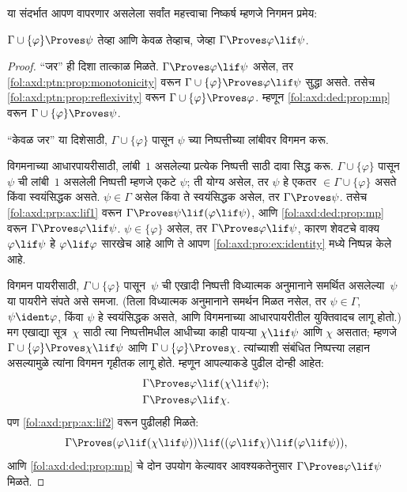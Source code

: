 या संदर्भात आपण वापरणार असलेला सर्वांत महत्त्वाचा निष्कर्ष म्हणजे निगमन
प्रमेय:

\begin{thm}[निगमन प्रमेय]
\label{fol:axd:ded:thm:deduction-thm} $\Gamma \cup \{\varphi\} \Proves \psi$ तेव्हा आणि
केवळ तेव्हाच, जेव्हा $\Gamma \Proves \varphi \lif \psi$.
\end{thm}

\begin{proof}
``जर'' ही दिशा तात्काळ मिळते. $\Gamma \Proves \varphi \lif \psi$ असेल, तर
\ref{fol:axd:ptn:prop:monotonicity} वरून $\Gamma \cup \{\varphi\} \Proves \varphi \lif \psi$
सुद्धा असते. तसेच \ref{fol:axd:ptn:prop:reflexivity} वरून
$\Gamma \cup \{\varphi\} \Proves \varphi$. म्हणून \ref{fol:axd:ded:prop:mp} वरून
$\Gamma \cup \{\varphi\} \Proves \psi$.

``केवळ जर'' या दिशेसाठी, $\Gamma \cup \{\varphi\}$ पासून $\psi$ च्या
निष्पत्तीच्या लांबीवर विगमन करू.

विगमनाच्या आधारपायरीसाठी, लांबी~$1$ असलेल्या प्रत्येक निष्पत्ती साठी
दावा सिद्ध करू. $\Gamma \cup \{\varphi\}$ पासून~$\psi$ ची लांबी~$1$ असलेली
निष्पत्ती म्हणजे एकटे $\psi$; ती योग्य असेल, तर $\psi$ हे एकतर
$\in \Gamma \cup \{\varphi\}$ असते किंवा स्वयंसिद्धक असते. $\psi \in \Gamma$
असेल किंवा ते स्वयंसिद्धक असेल, तर $\Gamma \Proves \psi$. तसेच
\ref{fol:axd:prp:ax:lif1} वरून $\Gamma \Proves \psi \lif (\varphi \lif \psi)$, आणि
\ref{fol:axd:ded:prop:mp} वरून $\Gamma \Proves \varphi \lif \psi$. $\psi \in \{ \varphi\}$
असेल, तर $\Gamma \Proves \varphi \lif \psi$, कारण शेवटचे वाक्य~$\varphi
\lif \psi$ हे $\varphi \lif \varphi$ सारखेच आहे आणि ते आपण
\ref{fol:axd:pro:ex:identity} मध्ये निष्पन्न केले आहे.

विगमन पायरीसाठी, $\Gamma \cup \{\varphi\}$ पासून~$\psi$ ची एखादी
निष्पत्ती विध्यात्मक अनुमानाने समर्थित असलेल्या~$\psi$ या पायरीने
संपते असे समजा. (तिला विध्यात्मक अनुमानाने समर्थन मिळत नसेल, तर
$\psi \in \Gamma$, $\psi \ident \varphi$, किंवा $\psi$ हे स्वयंसिद्धक असते, आणि
विगमनाच्या आधारपायरीतील युक्तिवादच लागू होतो.) मग एखाद्या
सूत्र~$\chi$ साठी त्या निष्पत्तीमधील आधीच्या काही पायऱ्या
$\chi \lif \psi$ आणि $\chi$ असतात; म्हणजे $\Gamma \cup \{\varphi\} \Proves \chi \lif \psi$
आणि $\Gamma \cup \{\varphi\} \Proves \chi$. त्यांच्याशी संबंधित
निष्पत्त्या लहान असल्यामुळे त्यांना विगमन गृहीतक लागू होते. म्हणून
आपल्याकडे पुढील दोन्ही आहेत:
\begin{align*}
  & \Gamma \Proves \varphi \lif (\chi \lif \psi); \\
  & \Gamma \Proves \varphi \lif \chi.
\end{align*}
पण \ref{fol:axd:prp:ax:lif2} वरून पुढीलही मिळते:
\[\Gamma \Proves (\varphi \lif (\chi \lif \psi)) \lif
((\varphi\lif \chi)  \lif (\varphi \lif \psi)),
\]
आणि \ref{fol:axd:ded:prop:mp} चे दोन उपयोग केल्यावर आवश्यकतेनुसार
$\Gamma \Proves \varphi \lif \psi$ मिळते.
\end{proof}

